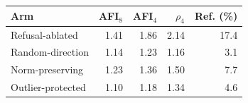 \setlength{\tabcolsep}{3.5pt}
\begin{tabular}{@{}p{}rrrr@{}}
\toprule
Arm & AFI$_8$ & AFI$_4$ & $\rho_4$ & Ref. (\%) \\
\midrule
Refusal-ablated & 1.41 & 1.86 & 2.14 & 17.4 \\
Random-direction & 1.14 & 1.23 & 1.16 & 3.1 \\
Norm-preserving & 1.23 & 1.36 & 1.50 & 7.7 \\
Outlier-protected & 1.10 & 1.18 & 1.34 & 4.6 \\
\bottomrule
\end{tabular}
